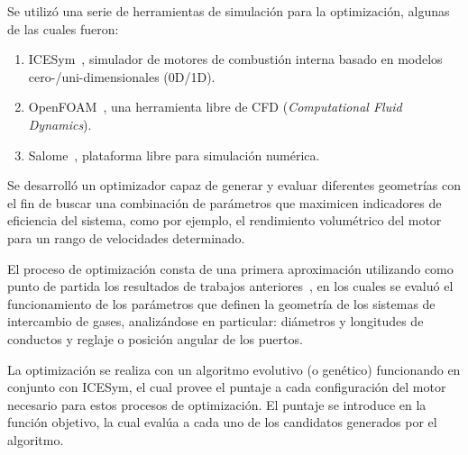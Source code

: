 Se utilizó una serie de herramientas de simulación para la optimización, algunas
de las cuales fueron:

\begin{enumerate}[label=\Alph*., leftmargin=*, noitemsep]
    \item ICESym~\parencite{icesym}, simulador de motores de combustión interna basado en modelos cero-/uni-dimensionales (0D/1D).
    \item OpenFOAM~\parencite{openfoam}, una herramienta libre de CFD (\textit{Computational Fluid Dynamics}).
    \item Salome~\parencite{salome}, plataforma libre para simulación numérica.
\end{enumerate}


Se desarrolló un optimizador capaz de generar y evaluar diferentes geometrías
con el fin de buscar una combinación de parámetros que maximicen indicadores de
eficiencia del sistema, como por ejemplo, el rendimiento volumétrico del motor
para un rango de velocidades determinado.

El proceso de optimización consta de una primera aproximación utilizando como
punto de partida los resultados de trabajos anteriores~\parencite{lopez13}, en
los cuales se evaluó el funcionamiento de los parámetros que definen la
geometría de los sistemas de intercambio de gases, analizándose en particular:
diámetros y longitudes de conductos y reglaje o posición angular de los puertos.

La optimización se realiza con un algoritmo evolutivo (o genético) funcionando
en conjunto con ICESym, el cual provee el puntaje a cada configuración del
motor necesario para estos procesos de optimización.
%
El puntaje se introduce en la función objetivo, la cual evalúa a cada uno de los
candidatos generados por el algoritmo.

